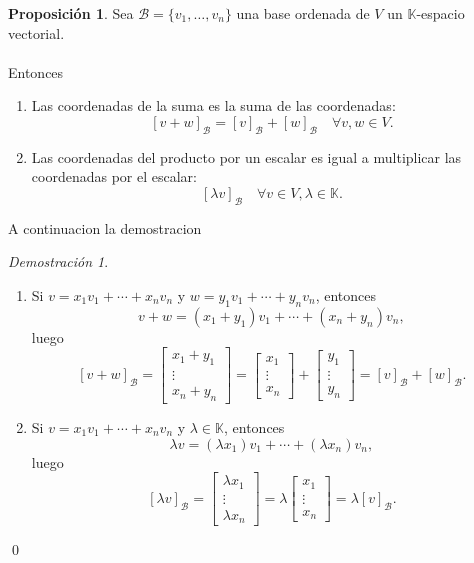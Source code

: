 \documentclass{article}
\theoremstyle{definition}
\theoremstyle{definition}
\newtheorem{prop}[teo]{Proposición}
\theoremstyle{remark}
\newtheorem*{demo}{Demostración}
\begin{document}
  \begin{prop}
    Sea $\mathcal{B}=\{v_1, \dots ,v_n\}$ una base ordenada de $V$ un $\mathbb{K}$-espacio vectorial.\\\\ Entonces 
  \begin{enumerate}[label=(\arabic*)]
    \item Las coordenadas de la suma es la suma de las coordenadas: \[
        [v+w]_\mathcal{B}=[v]_{\mathcal{B}}+[w]_{\mathcal{B}} \quad \forall v , w \in V.
      \]
    \item Las coordenadas del producto por un escalar es igual a multiplicar las coordenadas por el escalar: \[
        [\lambda v]_{\mathcal{B}}\quad \forall v \in V, \lambda \in \mathbb{K}.
      \]
  \end{enumerate}

      A continuacion la demostracion
  \end{prop}
  \begin{demo}\;
    \begin{enumerate}[label=(\arabic*)] 
       \item Si $v=x_1v_1+ \cdots + x_nv_n$ \; y \; $w=y_1v_1+\cdots + y_nv_n$, entonces \[
v+w=(x_1+y_1)v_1+\cdots + (x_n+y_n)v_n,
      \]
      luego \[
        [v+w]_\mathcal{B}=\begin{bmatrix}x_1+y_1 \\ \vdots \\ x_n + y_n \end{bmatrix} = \begin{bmatrix} x_1 \\ \vdots \\ x_n \end{bmatrix} + \begin{bmatrix}y_1 \\ \vdots \\ y_n \end{bmatrix}=[v]_{\mathcal{B}}+[w]_{\mathcal{B}}.
      \]
      \item Si $v=x_1v_1+ \cdots + x_nv_n$ \; y \; $\lambda \in \mathbb{K}$, entonces \[
\lambda v = (\lambda x_1 ) v_1 + \cdots + (\lambda x_n) v_n,
        \]
        luego \[
          [\lambda v ]_\mathcal{B}=\begin{bmatrix}\lambda x_1 \\ \vdots \\ \lambda x_n \end{bmatrix} = \lambda \begin{bmatrix} x_1 \\ \vdots \\ x_n \end{bmatrix} = \lambda [v]_\mathcal{B}.
        \]
    \end{enumerate}
    \qed
  \end{demo}
  \pagebreak 
  
\end{document}
